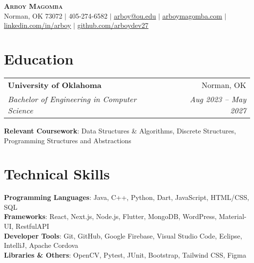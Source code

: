 \documentclass[letterpaper,11pt]{article}
\makeatletter
\newcommand{\resumeSubheading}[4]{
  \vspace{-2pt}\item
    \begin{tabular*}{0.97\textwidth}[t]{l@{\extracolsep{\fill}}r}
      \textbf{#1} & #2 \\
      \textit{\small#3} & \textit{\small #4} \\
    \end{tabular*}\vspace{-7pt}
}
\newcommand{\resumeSubHeadingListStart}{\begin{itemize}[leftmargin=0.15in, label={}]}
\newcommand{\resumeSubHeadingListEnd}{\end{itemize}}
\makeatother
\begin{document}
\begin{center}
    \textbf{\Huge \scshape Arboy Magomba} \\ \vspace{1pt}
    \small Norman, OK 73072 $|$
    \small 405-274-6582 $|$
    \href{mailto:x@x.com}{\underline{arboy@ou.edu}} $|$ 
    \href{https://arboymagomba.com/}{\underline{arboymagomba.com}} $|$
    \href{https://www.linkedin.com/in/arbogast-magomba-92a080241/}{\underline{linkedin.com/in/arboy}} $|$
    \href{https://github.com/arboydev27}{\underline{github.com/arboydev27}}
\end{center}


\section{Education}
  \resumeSubHeadingListStart
    \resumeSubheading
      {University of Oklahoma}{Norman, OK}
      {Bachelor of Engineering in Computer Science}{Aug 2023 -- May 2027}
      \small{\item{
     \textbf{Relevant Coursework}{: Data Structures \& Algorithms, Discrete Structures, Programming Structures and Abstractions} \\}}
  \resumeSubHeadingListEnd

\section{Technical Skills}
 \begin{itemize}[leftmargin=0.15in, label={}]
    \small{\item{
     \textbf{Programming Languages}{: Java, C++, Python, Dart, JavaScript, HTML/CSS, SQL} \\
     \textbf{Frameworks}{: React, Next.js, Node.js, Flutter, MongoDB, WordPress, Material-UI, RestfulAPI} \\
     \textbf{Developer Tools}{: Git, GitHub, Google Firebase, Visual Studio Code, Eclipse, IntelliJ, Apache Cordova} \\
    \textbf{Libraries \& Others}{: OpenCV, Pytest, JUnit, Bootstrap, Tailwind CSS, Figma}
    }}
 \end{itemize}

\end{document}
